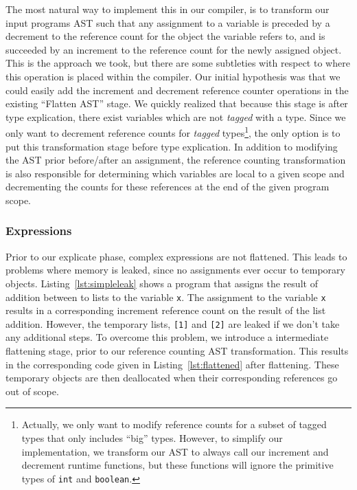 \documentclass{sigplanconf}
\begin{document}
The most natural way to implement this in our compiler, is to transform our input programs AST such that any assignment to a variable is preceded by a decrement to the reference count for the object the variable refers to, and is succeeded by an increment to the reference count for the newly assigned object.  This is the approach we took, but there are some subtleties with respect to where this operation is placed within the compiler.  Our initial hypothesis was that we could easily add the increment and decrement reference counter operations in the existing ``Flatten AST'' stage.  We quickly realized that because this stage is after type explication, there exist variables which are not \textit{tagged} with a type.  Since we only want to decrement reference counts for \textit{tagged} types\footnote{Actually, we only want to modify reference counts for a subset of tagged types that only includes ``big'' types. However, to simplify our implementation, we transform our AST to always call our increment and decrement runtime functions, but these functions will ignore the primitive types of \texttt{int} and \texttt{boolean}.}, the only option is to put this transformation stage before type explication.  In addition to modifying the AST prior before/after an assignment, the reference counting transformation is also responsible for determining which variables are local to a given scope and decrementing the counts for these references at the end of the given program scope.

\subsubsection{Expressions}
Prior to our explicate phase, complex expressions are not flattened.  This leads to problems where memory is leaked, since no assignments ever occur to temporary objects.  Listing~\ref{lst:simpleleak} shows a program that assigns the result of addition between to lists to the variable \texttt{x}.  The assignment to the variable \texttt{x} results in a corresponding increment reference count on the result of the list addition.  However, the temporary lists, \texttt{[1]} and \texttt{[2]} are leaked if we don't take any additional steps.  To overcome this problem, we introduce a intermediate flattening stage, prior to our reference counting AST transformation.   This results in the corresponding code given in Listing~\ref{lst:flattened} after flattening.  These temporary objects are then deallocated when their corresponding references go out of scope.
\end{document}

